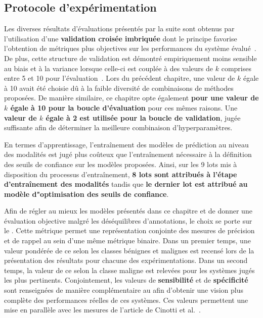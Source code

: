 \subsection{Protocole d’expérimentation}
Les diverses résultats d'évaluations présentés par la suite sont obtenus par l'utilisation d'une \textbf{validation croisée imbriquée} dont le principe favorise l'obtention de métriques plus objectives sur les performances du système évalué~\cite{Cawley2010}. De plus, cette structure de validation est démontré empiriquement moins sensible au biais et à la variance lorsque celle-ci est couplée à des valeurs de $k$ comprises entre 5 et 10 pour l'évaluation~\cite{James2000}. Lors du précédent chapitre, une valeur de $k$ égale à 10 avait été choisie dû à la faible diversité de combinaisons de méthodes proposées. De manière similaire, ce chapitre opte également \textbf{pour une valeur de $k$ égale à 10 pour la boucle d'évaluation} pour ces mêmes raisons. Une \textbf{valeur de $k$ égale à 2 est utilisée pour la boucle de validation}, jugée suffisante afin de déterminer la meilleure combinaison d'hyperparamètres.\par

En termes d'apprentissage, l'entraînement des modèles de prédiction au niveau des modalités est jugé plus coûteux que l'entraînement nécessaire à la définition des seuils de confiance sur les modèles proposées. Ainsi, sur les 9 lots mis à disposition du processus d'entraînement, \textbf{8 lots sont attribués à l'étape d'entraînement des modalités} tandis que \textbf{le dernier lot est attribué au modèle d"optimisation des seuils de confiance}.\par

Afin de régler au mieux les modèles présentés dans ce chapitre et de donner une évaluation objective malgré les déséquilibres d'annotations, le choix se porte sur le \textbf{\fscore{}}. Cette métrique permet une représentation conjointe des mesures de précision et de rappel au sein d'une même métrique binaire. Dans un premier temps, une valeur pondérée de ce \fscore{} selon les classes bénignes et malignes est recensé lors de la présentation des résultats pour chacune des expérimentations. Dans un second temps, la valeur de ce \fscore{} selon la classe maligne est relevées pour les systèmes jugés les plus pertinents. Conjointement, les valeurs de \textbf{sensibilité} et de \textbf{spécificité} sont renseignées de manière complémentaire au \fscore{} afin d'obtenir une vision plus complète des performances réelles de ces systèmes. Ces valeurs permettent une mise en parallèle avec les mesures de l'article de Cinotti et al.~\cite{Cinotti2016}.\par

